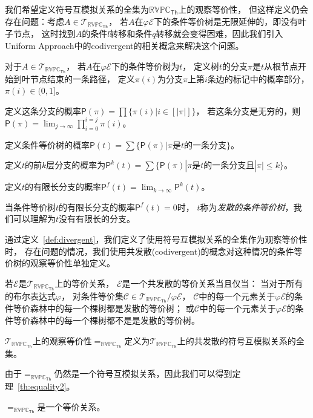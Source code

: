 我们希望定义符号互模拟关系的全集为$\mathbb{RVPC}_{\mathsf{Th}}$上的观察等价性，
但这样定义仍会存在问题：考虑$A\in\mathcal{T}_{\mathbb{RVPC}_{\mathsf{Th}}}$，
若$A$在$\varphi\mathcal{E}$下的条件等价树是无限延伸的，即没有叶子节点，
这时找到$A$的条件$l$转移和条件$q$转移就会变得困难，因此我们引入Uniform Approach中的codivergent的相关概念来解决这个问题。

\begin{definition}\label{def:divergent}
   对于$A\in\mathcal{T}_{\mathbb{RVPC}_{\mathsf{Th}}}$，
   若$A$在$\varphi\mathcal{E}$下的条件等价树为$t$，
   定义树$t$的分支$\pi$是$t$从根节点开始到叶节点结束的一条路径，
   定义$\pi(i)$为分支$\pi$上第$i$条边的标记中的概率部分，$\pi(i)\in(0,1]$。

   定义这条分支的概率$\mathsf{P}(\pi)=\prod\{\pi(i)|i\in [|\pi|]\}$，
   若这条分支是无穷的，则$\mathsf{P}(\pi)=\lim_{j\rightarrow \infty}\prod_{i=0}^{i=j}\pi(i)$。

   定义条件等价树的概率$\mathsf{P}(t)=\sum\{\mathsf{P}(\pi)|\pi\textrm{是}t\textrm{的一条分支}\}$。
   
   定义$t$的前$k$层分支的概率为$\mathsf{P}^k(t)=\sum \{\mathsf{P}(\pi)|\pi\textrm{是}t\textrm{的一条分支且}|\pi|\leq k\}$。

   定义$t$的有限长分支的概率$\mathsf{P}^f(t)=\lim_{k\rightarrow\infty}\mathsf{P}^k(t)$。

   当条件等价树$t$的有限长分支的概率$\mathsf{P}^f(t)=0$时，
   $t$称为\textit{发散的条件等价树}，我们可以理解为$t$没有有限长的分支。
\end{definition}

通过定义~\ref{def:divergent}，我们定义了使用符号互模拟关系的全集作为观察等价性时，
存在问题的情况，我们使用共发散(codivergent)的概念对这种情况的条件等价树的观察等价性单独定义。

\begin{definition}
   若$\mathcal{E}$是$\mathcal{T}_{\mathbb{RVPC}_{\mathsf{Th}}}$上的等价关系，
   $\mathcal{E}$是一个共发散的等价关系当且仅当：
   当对于所有的布尔表达式$\varphi$，
   对条件等价集$\mathcal{C}\in\mathcal{T}_{\mathbb{RVPC}_{\mathsf{Th}}}/\varphi\mathcal{E}$，
   $\mathcal{C}$中的每一个元素关于$\varphi\mathcal{E}$的条件等价森林中的每一个棵树都是发散的等价树；
   或$\mathcal{C}$中的每一个元素关于$\varphi\mathcal{E}$的条件等价森林中的每一个棵树都不是是发散的等价树。
\end{definition}

\begin{definition}
   $\mathcal{T}_{\mathbb{RVPC}_{\mathsf{Th}}}$上的观察等价性$=_{\mathbb{RVPC}_{\mathsf{Th}}}$定义为$\mathcal{T}_{\mathbb{RVPC}_{\mathsf{Th}}}$上的共发散的符号互模拟关系的全集。
\end{definition}
由于$=_{\mathbb{RVPC}_{\mathsf{Th}}}$仍然是一个符号互模拟关系，因此我们可以得到定理~\ref{th:equality2}。
\begin{theorem}\label{th:equality2}
   $=_{\mathbb{RVPC}_{\mathsf{Th}}}$是一个等价关系。
\end{theorem}

